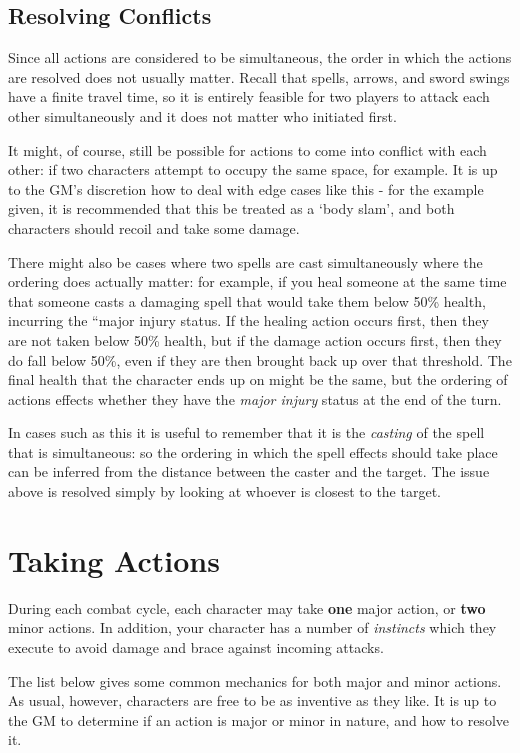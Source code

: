\subsection{Resolving Conflicts}

Since all actions are considered to be simultaneous, the order in which the actions are resolved does not usually matter. Recall that spells, arrows, and sword swings have a finite travel time, so it is entirely feasible for two players to attack each other simultaneously and it does not matter who initiated first.

It might, of course, still be possible for actions to come into conflict with each other: if two characters attempt to occupy the same space, for example. It is up to the GM's discretion how to deal with edge cases like this - for the example given, it is recommended that this be treated as a `body slam', and both characters should recoil and take some damage. 

There might also be cases where two spells are cast simultaneously where the ordering does actually matter: for example, if you heal someone at the same time that someone casts a damaging spell that would take them below 50\% health, incurring the ``major injury{\apos \apos} status. If the healing action occurs first, then they are not taken below 50\% health, but if the damage action occurs first, then they do fall below 50\%, even if they are then brought back up over that threshold. The final health that the character ends up on might be the same, but the ordering of actions effects whether they have the {\it major injury} status at the end of the turn. 

In cases such as this it is useful to remember that it is the {\it casting} of the spell that is simultaneous: so the ordering in which the spell effects should take place can be inferred from the distance between the caster and the target. The issue above is resolved simply by looking at whoever is closest to the target. 
 

 \section{Taking Actions}
 
 During each combat cycle, each character may take {\bf one} major action, or {\bf two} minor actions. In addition, your character has a number of {\it instincts} which they execute to avoid damage and brace against incoming attacks. 
 
 The list below gives some common mechanics for both major and minor actions. As usual, however, characters are free to be as inventive as they like. It is up to the GM to determine if an action is major or minor in nature, and how to resolve it. 
 

